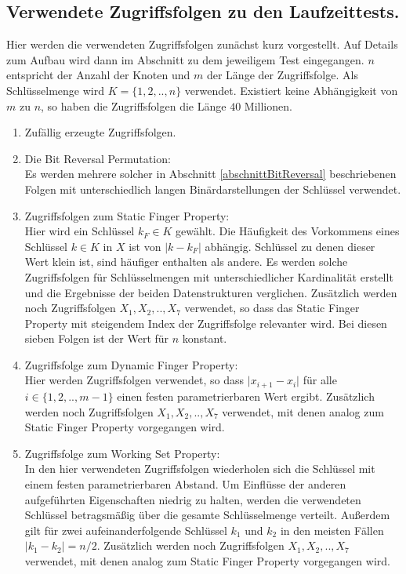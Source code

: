 \documentclass[a4paper,12pt]{article}
\begin{document}
\subsection{Verwendete Zugriffsfolgen zu den Laufzeittests.}
Hier werden die verwendeten Zugriffsfolgen zunächst kurz vorgestellt. Auf Details zum Aufbau wird dann im Abschnitt zu dem  jeweiligem Test eingegangen. $n$ entspricht der Anzahl der Knoten und $m$ der Länge der Zugriffsfolge. Als Schlüsselmenge wird $K = \{1,2,..,n\}$ verwendet. Existiert keine Abhängigkeit von $m$ zu $n$, so haben die Zugriffsfolgen die Länge $40$ Millionen. 

 \begin{enumerate}
 	\item Zufällig erzeugte Zugriffsfolgen.
 	\item Die Bit Reversal Permutation:\\
 	Es werden mehrere solcher in Abschnitt \ref{abschnittBitReversal} beschriebenen Folgen mit unterschiedlich langen Binärdarstellungen der Schlüssel verwendet.
 	\item Zugriffsfolgen zum Static Finger Property: \\
    Hier wird ein Schlüssel $k_F \in K$ gewählt. Die Häufigkeit des Vorkommens eines Schlüssel $k \in K$ in $X$ ist von $\vert k - k_F \vert$ abhängig. Schlüssel zu denen dieser Wert klein ist, sind häufiger enthalten als andere. Es werden solche Zugriffsfolgen für Schlüsselmengen mit unterschiedlicher Kardinalität erstellt und die Ergebnisse der beiden Datenstrukturen verglichen. Zusätzlich werden noch Zugriffsfolgen $X_1, X_2,.., X_7$ verwendet, so dass das Static Finger Property mit steigendem Index der Zugriffsfolge relevanter wird. Bei diesen sieben Folgen ist der Wert für $n$ konstant.
 	 \item Zugriffsfolge zum Dynamic Finger Property:\\
 	Hier werden Zugriffsfolgen verwendet, so dass $\vert x_{i+1} - x_{i} \vert$ für alle $i \in \{1, 2,..,m -1\} $ einen festen parametrierbaren Wert ergibt.  Zusätzlich werden noch Zugriffsfolgen $X_1, X_2,.., X_7$ verwendet, mit denen analog zum Static Finger Property vorgegangen wird.
 	\item Zugriffsfolge zum Working Set Property:\\
 	In den hier verwendeten Zugriffsfolgen wiederholen sich die Schlüssel mit einem festen parametrierbaren Abstand. Um Einflüsse der anderen aufgeführten Eigenschaften niedrig zu halten, werden die verwendeten Schlüssel betragsmäßig über die gesamte Schlüsselmenge verteilt. Außerdem gilt für zwei aufeinanderfolgende Schlüssel $k_1$ und $k_2$ in den meisten Fällen $\vert k_1 - k_2 \vert = n /2$. Zusätzlich werden noch Zugriffsfolgen $X_1, X_2,.., X_7$ verwendet, mit denen analog zum Static Finger Property vorgegangen wird.

\end{enumerate}
\end{document}
